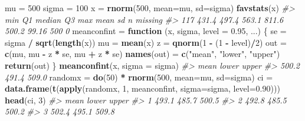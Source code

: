 \documentclass[]{book}
\makeatletter
\newenvironment{Shaded}{\begin{snugshade}}{\end{snugshade}}
\newcommand{\KeywordTok}[1]{\textcolor[rgb]{0.13,0.29,0.53}{\textbf{#1}}}
\newcommand{\DataTypeTok}[1]{\textcolor[rgb]{0.13,0.29,0.53}{#1}}
\newcommand{\DecValTok}[1]{\textcolor[rgb]{0.00,0.00,0.81}{#1}}
\newcommand{\FloatTok}[1]{\textcolor[rgb]{0.00,0.00,0.81}{#1}}
\newcommand{\StringTok}[1]{\textcolor[rgb]{0.31,0.60,0.02}{#1}}
\newcommand{\CommentTok}[1]{\textcolor[rgb]{0.56,0.35,0.01}{\textit{#1}}}
\newcommand{\ControlFlowTok}[1]{\textcolor[rgb]{0.13,0.29,0.53}{\textbf{#1}}}
\newcommand{\OperatorTok}[1]{\textcolor[rgb]{0.81,0.36,0.00}{\textbf{#1}}}
\newcommand{\NormalTok}[1]{#1}
\newenvironment{kframe}{%
\medskip{}
\setlength{\fboxsep}{.8em}
 \def\at@end@of@kframe{}%
 \ifinner\ifhmode%
  \def\at@end@of@kframe{\end{minipage}}%
  \begin{minipage}{\columnwidth}%
 \fi\fi%
 \def\FrameCommand##1{\hskip\@totalleftmargin \hskip-\fboxsep
 \colorbox{shadecolor}{##1}\hskip-\fboxsep
     \hskip-\linewidth \hskip-\@totalleftmargin \hskip\columnwidth}%
 \MakeFramed {\advance\hsize-\width
   \@totalleftmargin\z@ \linewidth\hsize
   \@setminipage}}%
 {\par\unskip\endMakeFramed%
 \at@end@of@kframe}
\renewenvironment{Shaded}{\begin{kframe}}{\end{kframe}}
\theoremstyle{definition}
\theoremstyle{definition}
\theoremstyle{definition}
\theoremstyle{remark}
\makeatother
\begin{document}
\begin{Shaded}
\begin{Highlighting}[]
\NormalTok{mu =}\StringTok{ }\DecValTok{500}
\NormalTok{sigma =}\StringTok{ }\DecValTok{100}
\NormalTok{x =}\StringTok{ }\KeywordTok{rnorm}\NormalTok{(}\DecValTok{500}\NormalTok{, }\DataTypeTok{mean=}\NormalTok{mu, }\DataTypeTok{sd=}\NormalTok{sigma)}
\KeywordTok{favstats}\NormalTok{(x)}
\CommentTok{#>  min    Q1 median    Q3   max  mean    sd   n missing}
\CommentTok{#>  117 431.4  497.4 563.1 811.6 500.2 99.16 500       0}
\NormalTok{meanconfint =}\StringTok{ }\ControlFlowTok{function}\NormalTok{ (x, sigma, }\DataTypeTok{level =} \FloatTok{0.95}\NormalTok{, ...) \{}
\NormalTok{  se =}\StringTok{ }\NormalTok{sigma }\OperatorTok{/}\StringTok{ }\KeywordTok{sqrt}\NormalTok{(}\KeywordTok{length}\NormalTok{(x))}
\NormalTok{  mu =}\StringTok{ }\KeywordTok{mean}\NormalTok{(x)}
\NormalTok{  z =}\StringTok{ }\KeywordTok{qnorm}\NormalTok{(}\DecValTok{1} \OperatorTok{-}\StringTok{ }\NormalTok{(}\DecValTok{1} \OperatorTok{-}\StringTok{ }\NormalTok{level)}\OperatorTok{/}\DecValTok{2}\NormalTok{)}
\NormalTok{  out =}\StringTok{ }\KeywordTok{c}\NormalTok{(mu, mu }\OperatorTok{-}\StringTok{ }\NormalTok{z }\OperatorTok{*}\StringTok{ }\NormalTok{se, mu }\OperatorTok{+}\StringTok{ }\NormalTok{z }\OperatorTok{*}\StringTok{ }\NormalTok{se)}
  \KeywordTok{names}\NormalTok{(out) =}\StringTok{ }\KeywordTok{c}\NormalTok{(}\StringTok{"mean"}\NormalTok{, }\StringTok{"lower"}\NormalTok{, }\StringTok{"upper"}\NormalTok{)}
  \KeywordTok{return}\NormalTok{(out)}
\NormalTok{\}}
\KeywordTok{meanconfint}\NormalTok{(x, }\DataTypeTok{sigma =}\NormalTok{ sigma)}
\CommentTok{#>  mean lower upper }
\CommentTok{#> 500.2 491.4 509.0}
\NormalTok{randomx =}\StringTok{ }\KeywordTok{do}\NormalTok{(}\DecValTok{50}\NormalTok{) }\OperatorTok{*}\StringTok{ }\KeywordTok{rnorm}\NormalTok{(}\DecValTok{500}\NormalTok{, }\DataTypeTok{mean=}\NormalTok{mu, }\DataTypeTok{sd=}\NormalTok{sigma)}
\NormalTok{ci =}\StringTok{ }\KeywordTok{data.frame}\NormalTok{(}\KeywordTok{t}\NormalTok{(}\KeywordTok{apply}\NormalTok{(randomx, }\DecValTok{1}\NormalTok{, meanconfint, }\DataTypeTok{sigma=}\NormalTok{sigma, }\DataTypeTok{level=}\FloatTok{0.90}\NormalTok{)))}
\KeywordTok{head}\NormalTok{(ci, }\DecValTok{3}\NormalTok{)}
\CommentTok{#>    mean lower upper}
\CommentTok{#> 1 493.1 485.7 500.5}
\CommentTok{#> 2 492.8 485.5 500.2}
\CommentTok{#> 3 502.4 495.1 509.8}


\end{Highlighting}
\end{Shaded}
\end{document}
